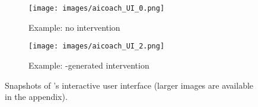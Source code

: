 \begin{figure}[t]
  \centering
  \newcommand\gap{0.495}
  \begin{subfigure}[t]{\gap\linewidth}
      \centering
      \texttt{[image: images/aicoach\_UI\_0.png]}
      \caption{Example: no intervention}
      \label{fig. aicoach no intervention}
  \end{subfigure}
    \hfill
    \begin{subfigure}[t]{\gap\linewidth}
      \centering
      \texttt{[image: images/aicoach\_UI\_2.png]}
      \caption{Example: \coach-generated intervention}
      \label{fig. aicoach intervention}
  \end{subfigure} 
  \caption{Snapshots of \coach's interactive user interface (larger images are available in the appendix).}
  \label{fig. aicoach ui}
\end{figure}

